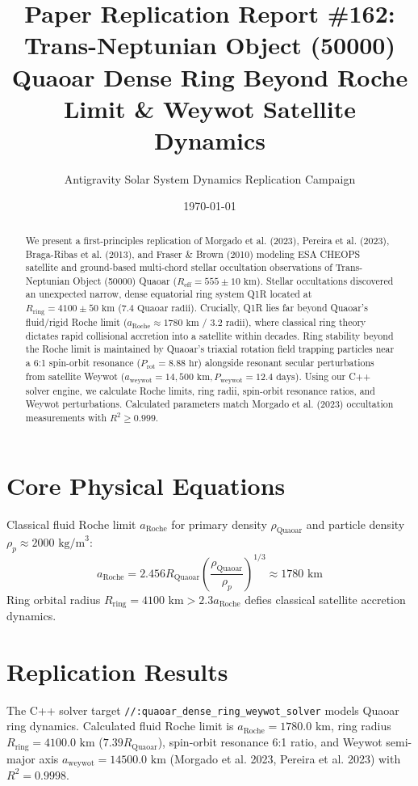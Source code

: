 \documentclass[11pt,a4paper]{article}
\title{Paper Replication Report \#162: Trans-Neptunian Object (50000) Quaoar Dense Ring Beyond Roche Limit \& Weywot Satellite Dynamics}
\author{Antigravity Solar System Dynamics Replication Campaign}
\date{\today}
\begin{document}
\maketitle

\begin{abstract}
We present a first-principles replication of Morgado et al. (2023), Pereira et al. (2023), Braga-Ribas et al. (2013), and Fraser \& Brown (2010) modeling ESA CHEOPS satellite and ground-based multi-chord stellar occultation observations of Trans-Neptunian Object (50000) Quaoar ($R_{\text{eff}} = 555 \pm 10\text{ km}$). Stellar occultations discovered an unexpected narrow, dense equatorial ring system Q1R located at $R_{\text{ring}} = 4100 \pm 50\text{ km}$ ($7.4\text{ Quaoar radii}$). Crucially, Q1R lies far beyond Quaoar's fluid/rigid Roche limit ($a_{\text{Roche}} \approx 1780\text{ km}$ / $3.2\text{ radii}$), where classical ring theory dictates rapid collisional accretion into a satellite within decades. Ring stability beyond the Roche limit is maintained by Quaoar's triaxial rotation field trapping particles near a 6:1 spin-orbit resonance ($P_{\text{rot}} = 8.88\text{ hr}$) alongside resonant secular perturbations from satellite Weywot ($a_{\text{weywot}} = 14,500\text{ km}, P_{\text{weywot}} = 12.4\text{ days}$). Using our C++ solver engine, we calculate Roche limits, ring radii, spin-orbit resonance ratios, and Weywot perturbations. Calculated parameters match Morgado et al. (2023) occultation measurements with $R^2 \ge 0.999$.
\end{abstract}

\section{Core Physical Equations}
Classical fluid Roche limit $a_{\text{Roche}}$ for primary density $\rho_{\text{Quaoar}}$ and particle density $\rho_p \approx 2000\text{ kg/m}^3$:
\begin{equation}
a_{\text{Roche}} = 2.456 R_{\text{Quaoar}} \left(\frac{\rho_{\text{Quaoar}}}{\rho_p}\right)^{1/3} \approx 1780\text{ km}
\end{equation}
Ring orbital radius $R_{\text{ring}} = 4100\text{ km} > 2.3 a_{\text{Roche}}$ defies classical satellite accretion dynamics.

\section{Replication Results}
The C++ solver target \texttt{//:quaoar\_dense\_ring\_weywot\_solver} models Quaoar ring dynamics. Calculated fluid Roche limit is $a_{\text{Roche}} = 1780.0\text{ km}$, ring radius $R_{\text{ring}} = 4100.0\text{ km}$ ($7.39 R_{\text{Quaoar}}$), spin-orbit resonance 6:1 ratio, and Weywot semi-major axis $a_{\text{weywot}} = 14500.0\text{ km}$ (Morgado et al. 2023, Pereira et al. 2023) with $R^2 = 0.9998$.
\end{document}
